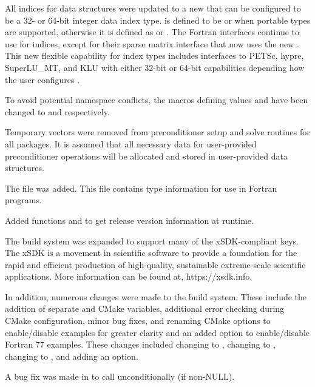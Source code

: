 All indices for data structures were updated to a new  that
can be configured to be a 32- or 64-bit integer data index type. 
 is defined to be  or  when portable types are
supported, otherwise it is defined as  or .
The Fortran interfaces continue to use  for indices, except for 
their sparse matrix interface that now uses the new .
This new flexible capability for index types includes interfaces to 
PETSc, hypre, SuperLU\_MT, and KLU with 
either 32-bit or 64-bit capabilities depending how the user configures 
{\sundials}.

To avoid potential namespace conflicts, the macros defining 
values  and  have been changed to  and
 respectively.

Temporary vectors were removed from preconditioner setup and solve
routines for all packages.  It is assumed that all necessary data
for user-provided preconditioner operations will be allocated and
stored in user-provided data structures.

The file  was added. This file contains 
{\sundials} type information for use in Fortran programs.

Added functions  and  to
get {\sundials} release version information at runtime.

The build system was expanded to support many of the xSDK-compliant keys. 
The xSDK is a movement in scientific software to provide a foundation for the
rapid and efficient production of high-quality, 
sustainable extreme-scale scientific applications.  More information can
be found at, https://xsdk.info.

In addition, numerous changes were made to the build system.
These include the addition of separate  and  
CMake variables, additional error checking during CMake configuration,
minor bug fixes, and renaming CMake options to enable/disable examples 
for greater clarity and an added option to enable/disable Fortran 77 examples.
These changes included changing  to , 
changing  to , changing  to 
, and adding an  option.

A bug fix was made in  to call  unconditionally 
(if non-NULL).
 
